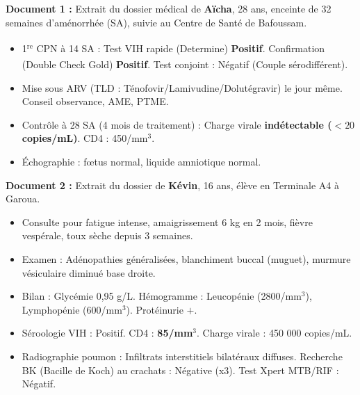 \documentclass[11pt]{article}
\begin{document}
\begin{exercice}
\textbf{Document 1 :} Extrait du dossier médical de \textbf{Aïcha}, 28 ans, enceinte de 32 semaines d'aménorrhée (SA), suivie au Centre de Santé de Bafoussam.
\begin{itemize}
    \item 1$^{\text{re}}$ CPN à 14 SA : Test VIH rapide (Determine\textsuperscript{\textregistered}) \textbf{Positif}. Confirmation (Double Check Gold\textsuperscript{\textregistered}) \textbf{Positif}. Test conjoint : Négatif (Couple sérodifférent).
    \item Mise sous ARV (TLD : Ténofovir/Lamivudine/Dolutégravir) le jour même. Conseil observance, AME, PTME.
    \item Contrôle à 28 SA (4 mois de traitement) : Charge virale \textbf{indétectable ($< 20$ copies/mL)}. CD4 : 450/mm$^3$.
    \item Échographie : fœtus normal, liquide amniotique normal.
\end{itemize}
\textbf{Document 2 :} Extrait du dossier de \textbf{Kévin}, 16 ans, élève en Terminale A4 à Garoua.
\begin{itemize}
    \item Consulte pour fatigue intense, amaigrissement 6 kg en 2 mois, fièvre vespérale, toux sèche depuis 3 semaines.
    \item Examen : Adénopathies généralisées, blanchiment buccal (muguet), murmure vésiculaire diminué base droite.
    \item Bilan : Glycémie 0,95 g/L. Hémogramme : Leucopénie (2800/mm$^3$), Lymphopénie (600/mm$^3$). Protéinurie $+$.
    \item Séroologie VIH : Positif. CD4 : \textbf{85/mm$^3$}. Charge virale : 450 000 copies/mL.
    \item Radiographie poumon : Infiltrats interstitiels bilatéraux diffuses. Recherche BK (Bacille de Koch) au crachats : Négative (x3). Test Xpert MTB/RIF : Négatif.
\end{itemize}


\end{exercice}
\end{document}
